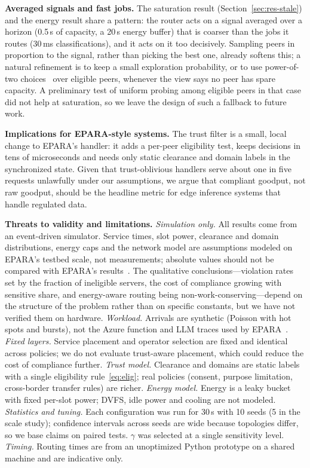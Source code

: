 \documentclass[journal]{IEEEtran}
\begin{document}
\textbf{Averaged signals and fast jobs.}
The saturation result (Section~\ref{sec:res-stale}) and the energy result share a pattern: the router acts on a signal averaged over a horizon (0.5\,s of capacity, a 20\,s energy buffer) that is coarser than the jobs it routes (30\,ms classifications), and it acts on it too decisively. Sampling peers in proportion to the signal, rather than picking the best one, already softens this; a natural refinement is to keep a small exploration probability, or to use power-of-two choices~\cite{mitzenmacher2001two} over eligible peers, whenever the view says no peer has spare capacity. A preliminary test of uniform probing among eligible peers in that case did not help at saturation, so we leave the design of such a fallback to future work.

\textbf{Implications for EPARA-style systems.}
The trust filter is a small, local change to EPARA's handler: it adds a per-peer eligibility test, keeps decisions in tens of microseconds and needs only static clearance and domain labels in the synchronized state. Given that trust-oblivious handlers serve about one in five requests unlawfully under our assumptions, we argue that compliant goodput, not raw goodput, should be the headline metric for edge inference systems that handle regulated data.

\textbf{Threats to validity and limitations.}
\emph{Simulation only.} All results come from an event-driven simulator. Service times, slot power, clearance and domain distributions, energy caps and the network model are assumptions modeled on EPARA's testbed scale, not measurements; absolute values should not be compared with EPARA's results~\cite{epara2025}. The qualitative conclusions---violation rates set by the fraction of ineligible servers, the cost of compliance growing with sensitive share, and energy-aware routing being non-work-conserving---depend on the structure of the problem rather than on specific constants, but we have not verified them on hardware.
\emph{Workload.} Arrivals are synthetic (Poisson with hot spots and bursts), not the Azure function and LLM traces used by EPARA~\cite{shahrad2020serverless,epara2025}.
\emph{Fixed layers.} Service placement and operator selection are fixed and identical across policies; we do not evaluate trust-aware placement, which could reduce the cost of compliance further.
\emph{Trust model.} Clearance and domains are static labels with a single eligibility rule~\eqref{eq:elig}; real policies (consent, purpose limitation, cross-border transfer rules) are richer.
\emph{Energy model.} Energy is a leaky bucket with fixed per-slot power; DVFS, idle power and cooling are not modeled.
\emph{Statistics and tuning.} Each configuration was run for 30\,s with 10 seeds (5 in the scale study); confidence intervals across seeds are wide because topologies differ, so we base claims on paired tests. $\gamma$ was selected at a single sensitivity level.
\emph{Timing.} Routing times are from an unoptimized Python prototype on a shared machine and are indicative only.
\end{document}
